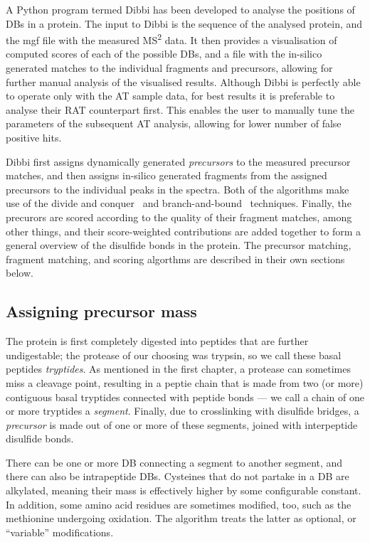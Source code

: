 A Python program termed Dibbi has been developed to analyse the positions of DBs in a protein. The input to Dibbi is the sequence of the analysed protein, and the mgf file with the measured MS\textsuperscript{2} data. It then provides a visualisation of computed scores of each of the possible DBs, and a file with the in-silico generated matches to the individual fragments and precursors, allowing for further manual analysis of the visualised results. Although Dibbi is perfectly able to operate only with the AT sample data, for best results it is preferable to analyse their RAT counterpart first. This enables the user to manually tune the parameters of the subsequent AT analysis, allowing for lower number of false positive hits.

Dibbi first assigns dynamically generated \emph{precursors} to the measured precursor matches, and then assigns in-silico generated fragments from the assigned precursors to the individual peaks in the spectra. Both of the algorithms make use of the divide and conquer~\cite{smith1985design} and branch-and-bound~\cite{boyd2007branch} techniques. Finally, the precurors are scored according to the quality of their fragment matches, among other things, and their score-weighted contributions are added together to form a general overview of the disulfide bonds in the protein. The precursor matching, fragment matching, and scoring algorthms are described in their own sections below.

\subsection{Assigning precursor mass}

The protein is first completely digested into peptides that are further undigestable; the protease of our choosing was trypsin, so we call these basal peptides \emph{tryptides}. As mentioned in the first chapter, a protease can sometimes miss a cleavage point, resulting in a peptie chain that is made from two (or more) contiguous basal tryptides connected with peptide bonds --- we call a chain of one or more tryptides a \emph{segment}. Finally, due to crosslinking with disulfide bridges, a \emph{precursor} is made out of one or more of these segments, joined with interpeptide disulfide bonds.

There can be one or more DB connecting a segment to another segment, and there can also be intrapeptide DBs. Cysteines that do not partake in a DB are alkylated, meaning their mass is effectively higher by some configurable constant. In addition, some amino acid residues are sometimes modified, too, such as the methionine undergoing oxidation. The algorithm treats the latter as optional, or ``variable'' modifications.

